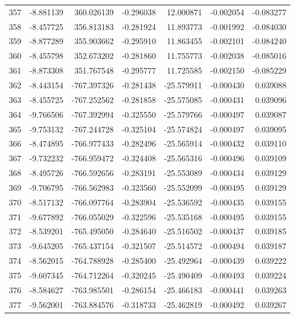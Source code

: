 \begin{tabular}{rrrrrrr}
 357 &  -8.881139 &  360.026139 & -0.296038 &  12.000871 &  -0.002054 & -0.083277 \\
 358 &  -8.457725 &  356.813183 & -0.281924 &  11.893773 &  -0.001992 & -0.084030 \\
 359 &  -8.877289 &  355.903662 & -0.295910 &  11.863455 &  -0.002101 & -0.084240 \\
 360 &  -8.455798 &  352.673202 & -0.281860 &  11.755773 &  -0.002038 & -0.085016 \\
 361 &  -8.873308 &  351.767548 & -0.295777 &  11.725585 &  -0.002150 & -0.085229 \\
 362 &  -8.443154 & -767.397326 & -0.281438 & -25.579911 &  -0.000430 &  0.039088 \\
 363 &  -8.455725 & -767.252562 & -0.281858 & -25.575085 &  -0.000431 &  0.039096 \\
 364 &  -9.766506 & -767.392994 & -0.325550 & -25.579766 &  -0.000497 &  0.039087 \\
 365 &  -9.753132 & -767.244728 & -0.325104 & -25.574824 &  -0.000497 &  0.039095 \\
 366 &  -8.474895 & -766.977433 & -0.282496 & -25.565914 &  -0.000432 &  0.039110 \\
 367 &  -9.732232 & -766.959472 & -0.324408 & -25.565316 &  -0.000496 &  0.039109 \\
 368 &  -8.495726 & -766.592656 & -0.283191 & -25.553089 &  -0.000434 &  0.039129 \\
 369 &  -9.706795 & -766.562983 & -0.323560 & -25.552099 &  -0.000495 &  0.039129 \\
 370 &  -8.517132 & -766.097764 & -0.283904 & -25.536592 &  -0.000435 &  0.039155 \\
 371 &  -9.677892 & -766.055029 & -0.322596 & -25.535168 &  -0.000495 &  0.039155 \\
 372 &  -8.539201 & -765.495050 & -0.284640 & -25.516502 &  -0.000437 &  0.039185 \\
 373 &  -9.645205 & -765.437154 & -0.321507 & -25.514572 &  -0.000494 &  0.039187 \\
 374 &  -8.562015 & -764.788928 & -0.285400 & -25.492964 &  -0.000439 &  0.039222 \\
 375 &  -9.607345 & -764.712264 & -0.320245 & -25.490409 &  -0.000493 &  0.039224 \\
 376 &  -8.584627 & -763.985501 & -0.286154 & -25.466183 &  -0.000441 &  0.039263 \\
 377 &  -9.562001 & -763.884576 & -0.318733 & -25.462819 &  -0.000492 &  0.039267 \\

\end{tabular}
